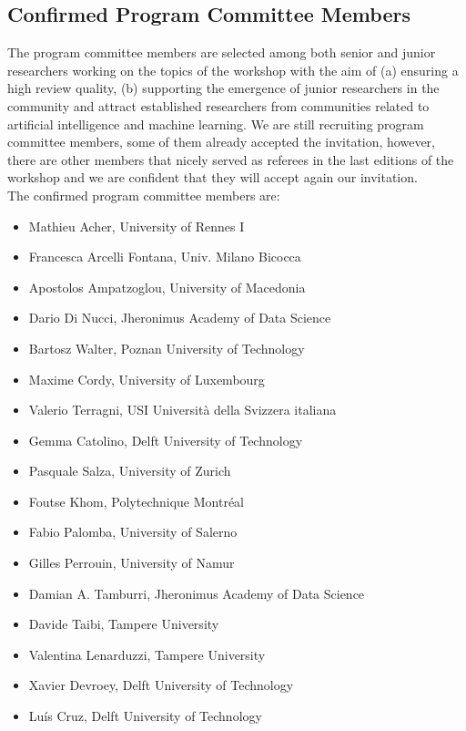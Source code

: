 \subsection{Confirmed Program Committee Members}
The program committee members are selected among both senior and junior researchers working on the topics of the workshop with the aim of (a) ensuring a high review quality, (b) supporting the emergence of junior researchers in the community and attract established researchers from communities related to artificial intelligence and machine learning.
We are still recruiting program committee members, some of them already accepted the invitation, however, there are other members that nicely served as referees in the last editions of the workshop and we are confident that they will accept again our invitation.\\
The confirmed program committee members are:
\begin{itemize}[itemsep=0.5em]
	
	\item Mathieu Acher, University of Rennes I 
	\item Francesca Arcelli Fontana, Univ. Milano Bicocca 
	\item Apostolos Ampatzoglou, University of Macedonia 
	\item Dario Di Nucci, Jheronimus Academy of Data Science 
	\item Bartosz Walter, Poznan University of Technology
	\item Maxime Cordy, University of Luxembourg
	\item Valerio Terragni, USI Università della Svizzera italiana
	\item Gemma Catolino, Delft University of Technology
	\item Pasquale Salza, University of Zurich
	\item Foutse Khom, Polytechnique Montréal
	\item Fabio Palomba, University of Salerno
	\item Gilles Perrouin, University of Namur
	\item Damian A. Tamburri, Jheronimus Academy of Data Science
	\item Davide Taibi, Tampere University
	\item Valentina Lenarduzzi, Tampere University
	\item Xavier Devroey, Delft University of Technology 
	\item Luís Cruz, Delft University of Technology 
	
\end{itemize}
	
